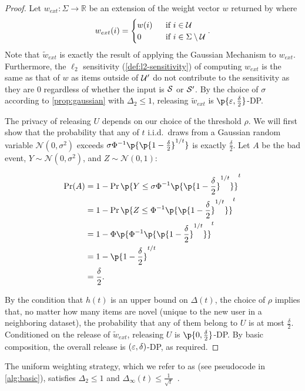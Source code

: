 \begin{proof}\label{proof:generic-privacy}
Let $w_{ext}: \Sigma \rightarrow \mathbb{R}$ be an extension of the weight vector $w$ returned by \weightalgo{} where
\begin{equation*}
w_{ext}(i) = 
\begin{cases}
    w(i) \; &\text{ if } i \in \mathcal{U} \\
    0 \; &\text{ if } i \in \Sigma \setminus \mathcal{U}
\end{cases}.
\end{equation*}
Note that $\tilde{w}_{ext}$ is exactly the result of applying the Gaussian Mechanism to $w_{ext}$.
Furthermore, the $\ell_2$ sensitivity (\cref{def:l2-sensitivity}) of computing $w_{ext}$ is the same as that of $w$ as items outside of $\mathcal{U}'$ do not contribute to the sensitivity as they are $0$ regardless of whether the input is $\mathcal{S}$ or $\mathcal{S}'$.
By the choice of $\sigma$ according to \cref{prop:gaussian} with $\Delta_2 \leq 1$, releasing $\tilde{w}_{ext}$ is $\p{\eps, \frac{\delta}{2}}$-DP.

The privacy of releasing $U$ depends on our choice of the threshold $\rho$.
We will first show that the probability that any of $t$ i.i.d.\ draws from a Gaussian random variable $\mathcal{N}(0, \sigma^2)$ exceeds $\sigma \Phi^{-1}\p{\p{1 - \frac{\delta}{2}}^{1/t}}$ is exactly $\frac{\delta}{2}$.
Let $A$ be the bad event, $Y \sim \mathcal{N}(0, \sigma^2)$, and $Z \sim \mathcal{N}(0, 1)$:

\begin{align*}
   \Pr(A) &= 1 - \Pr\p{Y \leq \sigma \Phi^{-1}\p{\p{1 - \frac{\delta}{2}}^{1/t}}}^t \\
   &= 1 - \Pr\p{Z \leq \Phi^{-1}\p{\p{1 - \frac{\delta}{2}}^{1/t}}}^t \\
   &= 1 - \Phi\p{\Phi^{-1}\p{\p{1 - \frac{\delta}{2}}^{1/t}}}^t \\
   &= 1 - \p{1 - \frac{\delta}{2}}^{t/t} \\
   &= \frac{\delta}{2}.
\end{align*}

By the condition that $h(t)$ is an upper bound on $\Delta(t)$, the choice of $\rho$ implies that, no matter how many items are novel (unique to the new user in a neighboring dataset), the probability that any of them belong to $U$ is at most $\frac{\delta}{2}$.
Conditioned on the release of $\tilde{w}_{ext}$, releasing $U$ is $\p{0, \frac{\delta}{2}}$-DP.
By basic composition, the overall release is $(\varepsilon, \delta)$-DP, as required.
\end{proof}

The uniform weighting strategy, which we refer to as \basicalgo{} (see pseudocode in \cref{alg:basic}), satisfies $\Delta_2 \leq 1$ and $\Delta_\infty(t) \leq \frac{1}{\sqrt{t}}$~\cite{gopi2020dpunion}.